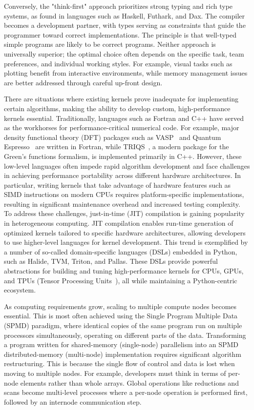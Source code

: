 Conversely, the "think-first" approach prioritizes strong typing and rich type systems, as found in languages such as Haskell, Futhark, and Dax. The compiler becomes a development partner, with types serving as constraints that guide the programmer toward correct implementations. The principle is that well-typed simple programs are likely to be correct programs. Neither approach is universally superior; the optimal choice often depends on the specific task, team preferences, and individual working styles. For example, visual tasks such as plotting benefit from interactive environments, while memory management issues are better addressed through careful up-front design.

There are situations where existing kernels prove inadequate for implementing certain algorithms, making the ability to develop custom, high-performance kernels essential. Traditionally, languages such as Fortran and C++ have served as the workhorses for performance-critical numerical code. For example, major density functional theory (DFT) packages such as VASP~\cite{Kresse1,Kresse2} and Quantum Espresso~\cite{Gianno_2009_QUANTUM_ESPRESS} are written in Fortran, while TRIQS~\cite{Parcol_2015_TRIQS_A_toolbo}, a modern package for the Green's functions formalism, is implemented primarily in C++. However, these low-level languages often impede rapid algorithm development and face challenges in achieving performance portability across different hardware architectures. In particular, writing kernels that take advantage of hardware features such as SIMD instructions on modern CPUs requires platform-specific implementations, resulting in significant maintenance overhead and increased testing complexity. To address these challenges, just-in-time (JIT) compilation is gaining popularity in heterogeneous computing. JIT compilation enables run-time generation of optimized kernels tailored to specific hardware architectures, allowing developers to use higher-level languages for kernel development. This trend is exemplified by a number of so-called domain-specific languages (DSLs) embedded in Python, such as Halide, TVM, Triton, and Pallas. These DSLs provide powerful abstractions for building and tuning high-performance kernels for CPUs, GPUs, and TPUs (Tensor Processing Units~), all while maintaining a Python-centric ecosystem.

As computing requirements grow, scaling to multiple compute nodes becomes essential. This is most often achieved using the Single Program Multiple Data (SPMD) paradigm, where identical copies of the same program run on multiple processors simultaneously, operating on different parts of the data. Transforming a program written for shared-memory (single-node) parallelism into an SPMD distributed-memory (multi-node) implementation requires significant algorithm restructuring. This is because the single flow of control and data is lost when moving to multiple nodes. For example, developers must think in terms of per-node elements rather than whole arrays. Global operations like reductions and scans become multi-level processes where a per-node operation is performed first, followed by an internode communication step.

